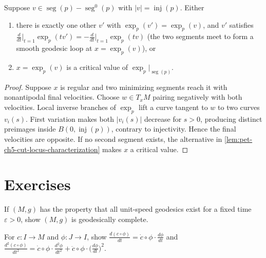 \begin{lemma}
  \label{lem:pet-ch5-klingenberg}
  Suppose $v\in\operatorname{seg}(p)-\operatorname{seg}^0(p)$ with
  $|v|=\operatorname{inj}(p)$. Either
  \begin{enumerate}
  \item[(1)] there is exactly one other $v'$ with $\exp_p(v')=\exp_p(v)$, and $v'$
  satisfies $\frac{d}{dt}\big|_{t=1}\exp_p(tv')=-\frac{d}{dt}\big|_{t=1}\exp_p(tv)$
  (the two segments meet to form a smooth geodesic loop at $x=\exp_p(v)$), or
  \item[(2)] $x=\exp_p(v)$ is a critical value of $\exp_p|_{\operatorname{seg}(p)}$.
  \end{enumerate}
\end{lemma}
\begin{proof}
  \sketch
  Suppose $x$ is regular and two minimizing segments reach it with nonantipodal
  final velocities.  Choose $w\in T_xM$ pairing negatively with both velocities.
  Local inverse branches of $\exp_p$ lift a curve tangent to $w$ to two curves
  $v_i(s)$.  First variation makes both $|v_i(s)|$ decrease for $s>0$, producing
  distinct preimages inside $B(0,\operatorname{inj}(p))$, contrary to injectivity.
  Hence the final velocities are opposite.  If no second segment exists, the
  alternative in \cref{lem:pet-ch5-cut-locus-characterization} makes $x$ a critical
  value.
\end{proof}

\section{Exercises}

\begin{remark}
  \label{rem:pet-ch5-ex-1}
  If $(M,g)$ has the property that all unit-speed geodesics exist for a fixed time
  $\varepsilon>0$, show $(M,g)$ is geodesically complete.
\end{remark}

\begin{remark}
  \label{rem:pet-ch5-ex-2}
  For $c:I\to M$ and $\phi:J\to I$, show
  $\frac{d(c\circ\phi)}{dt}=\dot c\circ\phi\cdot\frac{d\phi}{dt}$ and
  $\frac{d^2(c\circ\phi)}{dt^2}=\dot c\circ\phi\cdot\frac{d^2\phi}{dt^2}
  +\ddot c\circ\phi\cdot\big(\frac{d\phi}{dt}\big)^2$.
\end{remark}

